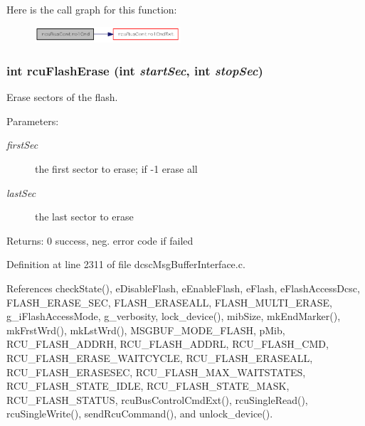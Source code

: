 Here is the call graph for this function:\begin{figure}[H]
\begin{center}
\leavevmode
\includegraphics[width=154pt]{group__dcsc__msg__buffer__access_gf74b29f8ded2feb57974c95e4863eac8_cgraph}
\end{center}
\end{figure}
\hypertarget{group__dcsc__msg__buffer__access_g78e6fc883a098cf548e9d0ba618ecb16}{
\subsubsection[rcuFlashErase]{\setlength{\rightskip}{0pt plus 5cm}int rcu\-Flash\-Erase (int {\em start\-Sec}, int {\em stop\-Sec})}}
\label{group__dcsc__msg__buffer__access_g78e6fc883a098cf548e9d0ba618ecb16}


Erase sectors of the flash. 

\begin{Desc}
\item[Parameters:]
\begin{description}
\item[{\em first\-Sec}]the first sector to erase; if -1 erase all \item[{\em last\-Sec}]the last sector to erase \end{description}
\end{Desc}
\begin{Desc}
\item[Returns:]0 success, neg. error code if failed \end{Desc}


Definition at line 2311 of file dcsc\-Msg\-Buffer\-Interface.c.

References check\-State(), e\-Disable\-Flash, e\-Enable\-Flash, e\-Flash, e\-Flash\-Access\-Dcsc, FLASH\_\-ERASE\_\-SEC, FLASH\_\-ERASEALL, FLASH\_\-MULTI\_\-ERASE, g\_\-i\-Flash\-Access\-Mode, g\_\-verbosity, lock\_\-device(), mib\-Size, mk\-End\-Marker(), mk\-Frst\-Wrd(), mk\-Lst\-Wrd(), MSGBUF\_\-MODE\_\-FLASH, p\-Mib, RCU\_\-FLASH\_\-ADDRH, RCU\_\-FLASH\_\-ADDRL, RCU\_\-FLASH\_\-CMD, RCU\_\-FLASH\_\-ERASE\_\-WAITCYCLE, RCU\_\-FLASH\_\-ERASEALL, RCU\_\-FLASH\_\-ERASESEC, RCU\_\-FLASH\_\-MAX\_\-WAITSTATES, RCU\_\-FLASH\_\-STATE\_\-IDLE, RCU\_\-FLASH\_\-STATE\_\-MASK, RCU\_\-FLASH\_\-STATUS, rcu\-Bus\-Control\-Cmd\-Ext(), rcu\-Single\-Read(), rcu\-Single\-Write(), send\-Rcu\-Command(), and unlock\_\-device().

